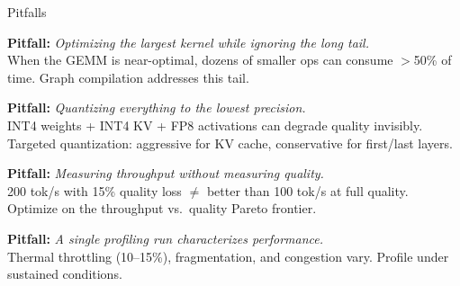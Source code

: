 \documentclass[aspectratio=169, 12pt]{beamer}
\begin{document}
\begin{frame}{Pitfalls}

\scriptsize
\textbf{Pitfall:} \textit{Optimizing the largest kernel while ignoring the long tail.}\\
When the GEMM is near-optimal, dozens of smaller ops can consume $>$50\% of time. Graph compilation addresses this tail.

\vspace{0.08cm}
\textbf{Pitfall:} \textit{Quantizing everything to the lowest precision.}\\
INT4 weights + INT4 KV + FP8 activations can degrade quality invisibly. Targeted quantization: aggressive for KV cache, conservative for first/last layers.

\vspace{0.08cm}
\textbf{Pitfall:} \textit{Measuring throughput without measuring quality.}\\
200 tok/s with 15\% quality loss $\neq$ better than 100 tok/s at full quality. Optimize on the throughput vs.\ quality Pareto frontier.

\vspace{0.08cm}
\textbf{Pitfall:} \textit{A single profiling run characterizes performance.}\\
Thermal throttling (10--15\%), fragmentation, and congestion vary. Profile under sustained conditions.

\end{frame}

\end{document}
